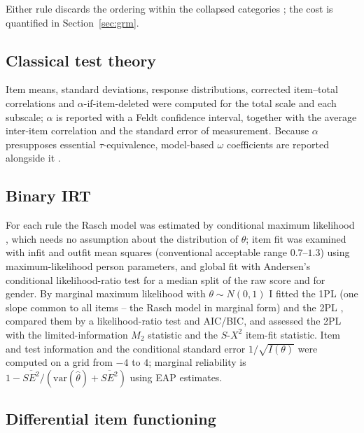 \documentclass[11pt,a4paper]{article}
\begin{document}
Either rule discards the ordering within the collapsed categories
\citep{maccallum2002practice}; the cost is quantified in
Section~\ref{sec:grm}.

\subsection{Classical test theory}

Item means, standard deviations, response distributions, corrected item--total
correlations and $\alpha$-if-item-deleted were computed for the total scale and each
subscale; $\alpha$ is reported with a Feldt confidence interval, together with the average inter-item correlation and the
standard error of measurement. Because $\alpha$ presupposes essential
$\tau$-equivalence, model-based $\omega$ coefficients
are reported alongside it \citep{mcdonald1999test,sijtsma2009use}.

\subsection{Binary IRT}\label{sec:methods_irt}

For each rule the Rasch model was estimated by conditional maximum likelihood
\citep{rasch1960probabilistic}, which needs no assumption about the
distribution of $\theta$; item fit was examined with infit and outfit mean squares
(conventional acceptable range $0.7$--$1.3$)
using maximum-likelihood person parameters, and global fit with Andersen's conditional
likelihood-ratio test for a median split of the raw score and for gender. By marginal maximum likelihood with
$\theta\sim N(0,1)$ \citep{chalmers2012mirt} I fitted the 1PL (one slope common to all
items -- the Rasch model in marginal form) and the 2PL \citep{birnbaum1968latent},
compared them by a likelihood-ratio test and AIC/BIC, and assessed the 2PL with the
limited-information $M_2$ statistic and the $S$-$X^2$ item-fit statistic. Item and test information and the
conditional standard error $1/\sqrt{I(\theta)}$ were computed on a grid from $-4$ to
$4$; marginal reliability is $1-\overline{SE^2}/(\mathrm{var}(\hat\theta)+\overline{SE^2})$
using EAP estimates.

\subsection{Differential item functioning}\label{sec:methods_dif}
\end{document}
